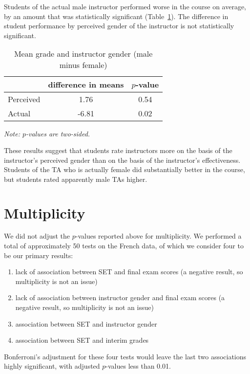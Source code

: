 \documentclass[12pt]{article}
\begin{document}
Students of the actual male instructor performed worse in the course on average,
by an amount that was statistically significant (Table~\ref{tab:macnell4}). 
The difference in student performance by 
perceived gender of the instructor is not statistically significant. 

\begin{table}[htbp]
  \centering
  \footnotesize 
  \caption{Mean grade and instructor gender (male minus female)}
    \begin{tabular}{lcc}
    \toprule 
                     & difference in means   & $p$-value    \\
   \midrule
    Perceived &         1.76       & 0.54      \\
    Actual  &            -6.81       & 0.02      \\
    \bottomrule
    \end{tabular}%
 \label{tab:macnell4}%
 
\textit{Note: $p$-values are two-sided.}
\end{table}%
\normalsize

These results suggest that students rate instructors more on the basis of the 
instructor's perceived gender than on the basis of the instructor's effectiveness. 
Students of the TA who is actually female did substantially better in the course, but
students rated apparently male TAs higher.

\section{Multiplicity}
We did not adjust the $p$-values reported above for multiplicity.
We performed a total of approximately 50 tests on the French data, of which we
consider four to be our primary results:
\begin{enumerate}
    \item[1\sc{fr}] lack of association between SET and final exam scores (a negative result,
               so multiplicity is not an issue)
    \item[2\sc{fr}] lack of association between instructor gender and final exam scores (a negative result,
               so multiplicity is not an issue)
    \item[3\sc{fr}] association between SET and instructor gender
    \item[4\sc{fr}] association between SET and interim grades
\end{enumerate}        
Bonferroni's adjustment for these four tests would leave the last two associations
highly significant, with adjusted $p$-values less than 0.01.
\end{document}
